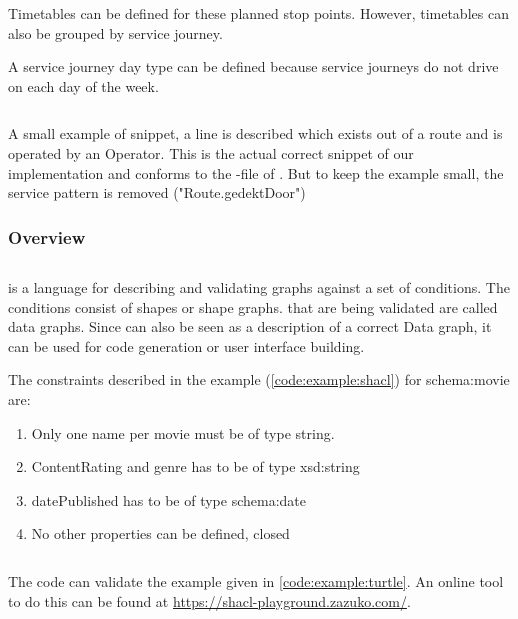 Timetables can be defined for these planned stop points. However, timetables can also be grouped by service journey.

A service journey day type can be defined because service journeys do not drive on each day of the week. 

\begin{listing}[H]
\inputminted[linenos,frame=single,breaklines]{jsonld}{code/oslo_example_line.jsonld}
\caption{A small example of  snippet, a line is described which exists out of a route and is operated by an Operator. This is the actual correct snippet of our implementation and conforms to the -file of . But to keep the example small, the service pattern is removed ("Route.gedektDoor")}
\label{code:example:line}
\end{listing}


\begin{landscape}
\subsubsection{Overview}

\end{landscape}


\subsection{}
\cite{noauthor_shapes_2017-1} is a language for describing and validating  graphs against a set of conditions. The conditions consist of shapes or shape graphs.  that are being validated are called data graphs. Since  can also be seen as a description of a correct Data graph, it can be used for code generation or user interface building.

The constraints described in the  example (\autoref{code:example:shacl})  for schema:movie are:
\begin{enumerate}
    \item Only one name per movie must be of type string.
    \item ContentRating and genre has to be of type xsd:string
    \item datePublished has to be of type schema:date
    \item No other properties can be defined, closed
    \end{enumerate}
\begin{listing}[H]
   \inputminted[linenos,frame=single]{turtle}{code/shacl_example.ttl}
    \caption{The  code can validate the  example given in \autoref{code:example:turtle}. An online tool to do this can be found at \url{https://shacl-playground.zazuko.com/}.}
    \label{code:example:shacl}
\end{listing}
